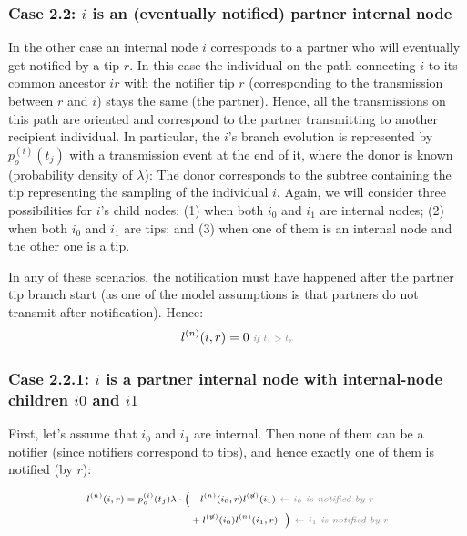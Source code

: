 \documentclass[a4paper,10pt]{article}
\begin{document}
\subsubsection*{Case 2.2: $i$ is an (eventually notified) partner internal node} 

In the other case an internal node $i$ corresponds to a partner who will eventually get notified by a tip $r$. In this case the individual on the path connecting $i$ to its common ancestor $ir$ with the notifier tip $r$ (corresponding to the transmission between $r$ and $i$) stays the same (the partner). Hence, all the transmissions on this path are oriented and correspond to the partner transmitting to another recipient individual. In particular, the $i$'s branch evolution is represented by $p_o^{(i)}(t_j)$ with a transmission event at the end of it, where the donor is known (probability density of $\lambda$): The donor corresponds to the subtree containing the tip representing the sampling of the individual $i$. %
Again, we will consider three possibilities for $i$'s child nodes: (1) when both $i_0$ and $i_1$ are internal nodes; (2) when both $i_0$ and $i_1$ are tips; and (3) when one of them is an internal node and the other one is a tip.

In any of these scenarios, the notification must have happened after the partner tip branch start (as one of the model assumptions is that partners do not transmit after notification). Hence:
\begin{equation}
\scriptsize
l^{(n)}(i, r) = 0 \textit{\color{gray}~if $t_i > t_r$} \\
\label{eq:lp-zero}
\end{equation}

\subsubsection*{Case 2.2.1: $i$ is a partner internal node with internal-node children $i0$ and $i1$} 

First, let's assume that $i_0$ and $i_1$ are internal. Then none of them can be a notifier (since notifiers correspond to tips), and hence exactly one of them is notified (by $r$):

\begin{equation}
\scriptsize
\begin{split}
l^{(n)}(i, r) = p_o^{(i)}(t_j) \lambda \cdot
\Big(&~~~l^{(n)}(i_0,r)l^{(\not{n})}(i_1) \textit{\color{gray}~$\leftarrow$ $i_0$ is notified by $r$} \\
& + l^{(\not{n})}(i_0)l^{(n)}(i_1,r)~~\Big) \textit{\color{gray}~$\leftarrow$ $i_1$ is notified by $r$} \\
 \end{split}
\label{eq:lp-int-int}
\end{equation}
\end{document}
